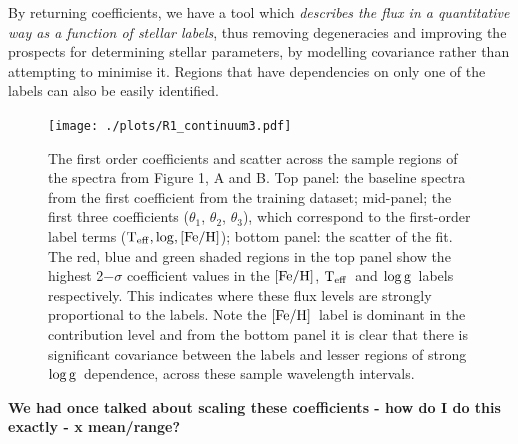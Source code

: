 \documentclass[12pt, preprint]{aastex}
\newcommand{\teff}{\mbox{$\rm T_{eff}$}}
\newcommand{\feh}{\mbox{$\rm [Fe/H]$}}
\newcommand{\logg}{\mbox{$\rm \log g$}}
\begin{document}
By returning coefficients, we have a tool which \textit{describes the flux in a quantitative way as a function of stellar labels}, thus removing degeneracies and improving the prospects for determining stellar parameters, by modelling covariance rather than attempting to minimise it. Regions that have dependencies on only one of the labels can also be easily identified. 

\begin{figure}[h!]
\centering
    \texttt{[image: ./plots/R1\_continuum3.pdf]}
  \caption{The first order coefficients and scatter across the sample regions of the spectra from Figure 1, A and B. Top panel: the baseline spectra from the first coefficient from the training dataset; mid-panel; the first three coefficients ($\theta_1$, $\theta_2$, $\theta_3$),  which correspond to the first-order label terms ($\teff, \log, \feh$); bottom panel: the scatter of the fit.  The red, blue and green shaded regions in the top panel show the highest 2$-\sigma$ coefficient values in the \feh, \teff\ and \logg\ labels respectively. This indicates where these flux levels are strongly proportional to the labels. Note the \feh\ label is dominant in the contribution level and from the bottom panel it is clear that there is significant covariance between the labels and lesser regions of strong \logg\ dependence, across these sample wavelength intervals.}
\label{fig:coeffs}
\end{figure}
\textbf{We had once talked about scaling these coefficients - how do I do this exactly - x mean/range?}

\end{document}
